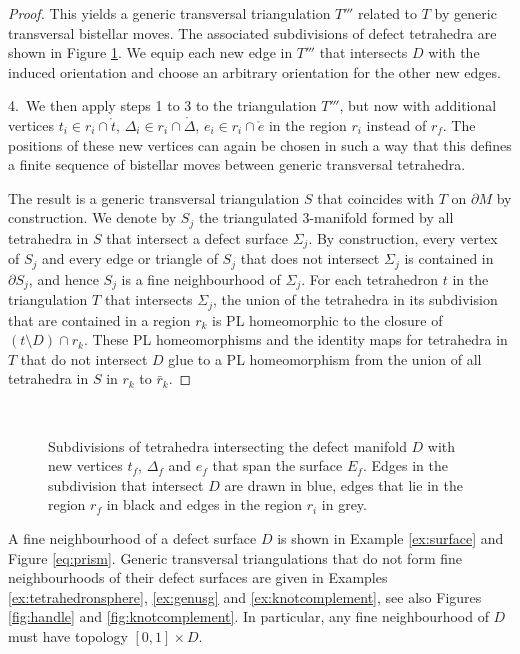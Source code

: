 \documentclass[1.5pt, a4paper]{article}
\begin{document}
\begin{proof}
This yields a generic  transversal  triangulation $T'''$ related to $T$ by generic transversal bistellar moves. The associated subdivisions of defect tetrahedra are shown in Figure \ref{fig:barycentric}.  We equip each new edge in $T'''$ that intersects $D$ with the induced orientation and choose an arbitrary orientation for the other new edges.  

4.~We then apply steps 1 to 3  to the triangulation $T'''$, but now with  additional vertices $t_i\in r_i\cap\mathring{t}$, $\Delta_i\in r_i\cap \mathring{\Delta}$, $e_i\in r_i\cap\mathring{e}$ in the region $r_i$ instead of $r_f$. The positions of these new vertices can again be chosen in such a way that this defines a finite sequence of  bistellar moves between generic transversal tetrahedra. 

The result is a generic transversal triangulation $S$  that coincides with $T$ on $\partial M$ by construction.  
We denote by $S_j$ the triangulated 3-manifold formed by all tetrahedra in $S$ that intersect a defect surface $\Sigma_j$. 
By construction, every vertex of $S_j$ and every edge or triangle of $S_j$ that does not intersect $\Sigma_j$ is contained in $\partial S_j$, and hence $S_j$ is a fine neighbourhood of $\Sigma_j$.  For each tetrahedron $t$ in the  triangulation $T$ that intersects  $\Sigma_j$,   the union  of the tetrahedra in its subdivision that are contained in a region $r_k$  is PL homeomorphic to  the closure of $(t\setminus D)\cap r_k$. These PL homeomorphisms and the identity maps for tetrahedra in $T$ that do not intersect $D$  glue to a PL homeomorphism from  the union of all tetrahedra in $S$  in $r_k$ to $\bar r_k$.  
\end{proof}



\begin{figure}
\begin{center}
\def\svgwidth{.99\columnwidth}
 
\end{center}
$\quad$

\vspace{-2cm}
\caption{Subdivisions of tetrahedra intersecting the defect manifold $D$ with new vertices $t_f$, $\Delta_f$ and $e_f$ that span the surface $E_f$.  Edges in the  subdivision that intersect $D$ are drawn in blue, edges  that lie in the region  $r_f$ in black and edges in the region $r_i$ in grey.}
\label{fig:barycentric}
\end{figure}

 A  fine neighbourhood of a defect surface $D$ is shown in Example \ref{ex:surface} and Figure \ref{eq:prism}. Generic transversal triangulations that do not form fine neighbourhoods  of their defect surfaces are given in  Examples \ref{ex:tetrahedronsphere}, \ref{ex:genusg} and \ref{ex:knotcomplement}, see also Figures \ref{fig:handle} and \ref{fig:knotcomplement}. In particular, any fine neighbourhood of  $D$ must have topology $[0,1]\times D$. 
\end{document}

